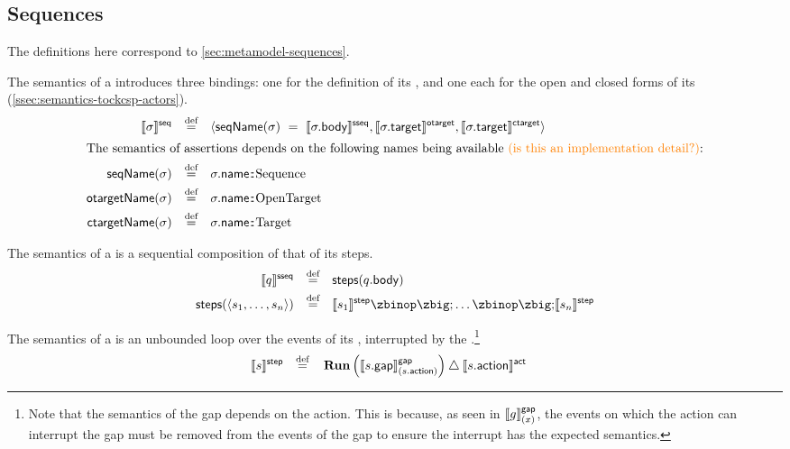 \subsection{Sequences}\label{ssec:semantics-tockcsp-sequences}

The definitions here correspond to \cref{sec:metamodel-sequences}.

\begin{defn}[\msequence]

The semantics of a \msequence{} introduces three bindings: one for the
definition of its \msubsequence, and one each for the open and closed forms of
its \mtarget{} (\cref{ssec:semantics-tockcsp-actors}).
%
\begin{align*}
	\seqsema{\aseq}
\quad\defeq\quad&	
\langle
	\seqnameOf{\aseq}\ =\ \sseqsema{\field{\aseq}{body}}
	, \otargetsema{\field{\aseq}{target}}
	, \ctargetsema{\field{\aseq}{target}}\rangle
\\
\intertext{The semantics of assertions depends on the following names being
available \todo{is this an implementation detail?}:}
	\seqnameOf{\aseq}
\quad\defeq\quad&
	\field{\aseq}{name} \cspnsop \text{Sequence}
\\
	\otargetnameOf{\aseq}
\quad\defeq\quad&
	\field{\aseq}{name} \cspnsop \text{OpenTarget}
\\
	\ctargetnameOf{\aseq}
\quad\defeq\quad&
	\field{\aseq}{name} \cspnsop \text{Target}
\end{align*}

\end{defn}

\begin{defn}[\msubsequence]

The semantics of a \msubsequence{} is a sequential composition of that of its steps.
%
\begin{align*}
	\sseqsema{\asseq}
	\quad\defeq\quad&	
	\funcname{steps}(\field{\asseq}{body})
\\
	\funcname{steps}(\langle \astep_1, \dotsc, \astep_n \rangle)
	\quad\defeq\quad&	
	\stepsema{\astep_1} \circseq \dotso \circseq \stepsema{\astep_n}
\end{align*}

\end{defn}

\begin{defn}[\msequencestep]

The semantics of a \msequencestep{} is an unbounded loop over the events of its
\msequencegap, interrupted by the \msequenceaction.\footnote{Note that the semantics of the gap depends
on the action.  This is because, as seen in \(\llbracket g \rrbracket^{\mathsf{gap}}_{(x)}\),
the events on which the action can interrupt the
gap must be removed from the events of the gap to ensure the interrupt has the
expected semantics.}
%
\begin{align*}
	\llbracket s \rrbracket^{\mathsf{step}}
\quad\mathbin{\overset{\text{def}}=}\quad&	
	\operatorname{\mathbf{Run}}\left(\llbracket s.\mathsf{gap} \rrbracket^{\mathsf{gap}}_{(s.\mathsf{action})}\right)
	\mathbin{\triangle} \llbracket s.\mathsf{action} \rrbracket^{\mathsf{act}}
\end{align*}
\end{defn}

